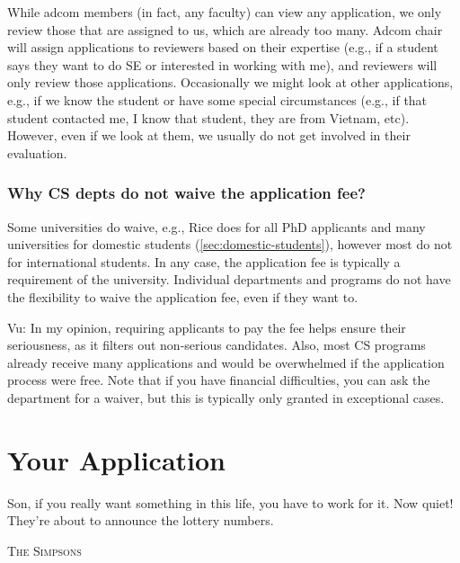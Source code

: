 \documentclass[oneside,11pt,dvipsnames]{book}
\newenvironment{commentbox}[1][]{
  \small
  \begin{mybox}
    {\small \textbf{#1}}
  }{
  \end{mybox}
}
\def\chapterinfo#1{%
  \addcontentsline{toc}{chapterinfo}{%
    \noexpand\numberline{}\color{black}{#1}}%
}
\begin{document}
While adcom members (in fact, any faculty) can view any application, we only review those that are assigned to us, which are already too many. Adcom chair will assign applications to reviewers based on their expertise (e.g., if a student says they want to do SE or interested in working with me), and reviewers will only review those applications. Occasionally we might look at other applications, e.g., if we know the student or have some special circumstances (e.g., if that student contacted me, I know that student, they are from Vietnam, etc). However, even if we look at them, we usually do not get involved in their evaluation.

\subsection{Why CS depts do not waive the application fee?}  

Some universities do waive, e.g., Rice does for all PhD applicants and many universities for domestic students (\autoref{sec:domestic-students}), however most do not for international students.  In any case, the application fee is typically a requirement of the university. Individual departments and programs do not have the flexibility to waive the application fee, even if they want to.

\begin{commentbox}{Vu:}
In my opinion, requiring applicants to pay the fee helps ensure their seriousness, as it filters out non-serious candidates. Also, most CS programs already receive many applications and would be overwhelmed if the application process were free.  Note that if you have financial difficulties, you can ask the department for a waiver, but this is typically only granted in exceptional cases.
\end{commentbox}



\chapter{Your Application}\label{sec:application}

\chapterinfo{The committee will look at various factors, but the most important ones are letters of recommendation (LORs),  statements of purpose (SOP), and research experience and potential, e.g., publications.}

\epigraph{Son, if you really want something in this life, you have to work for it. Now quiet! They’re about to announce the lottery numbers.}{\textsc{The Simpsons}}
\end{document}
